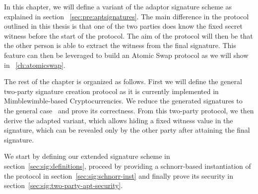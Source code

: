 In this chapter, we will define a variant of the adaptor signature scheme as explained in section ~\ref{sec:pre:aptsignatures}.
The main difference in the protocol outlined in this thesis is that one of the two parties does know the fixed secret witness before the start of the protocol. The aim of the protocol will then be that the other person is able to extract the witness from the final signature.
This feature can then be leveraged to build an Atomic Swap protocol as we will show in ~\ref{ch:atomicswap}.




The rest of the chapter is organized as follows. First we will define the general two-party signature creation protocol as it is currently implemented in Mimblewimble-based Cryptocurrencies.
We reduce the generated signatures to the general case~\cite{schnorr1989efficient} and prove its correctness. 
From this two-party protocol, we then derive the adapted variant, which allows hiding a fixed witness value in the signature, which can be revealed only by the other party after attaining the final signature.

We start by defining our extended signature scheme in section~\ref{sec:sig:definitions}, proceed by providing a schnorr-based instantiation of the protocol in section~\ref{sec:sig:schnorr-inst} and finally prove its security in section~\ref{sec:sig:two-party-apt-security}.



